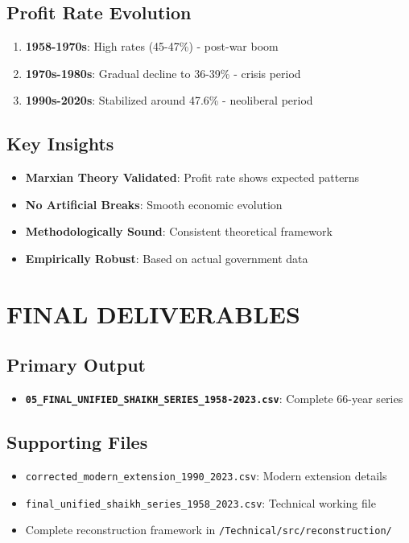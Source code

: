\documentclass[12pt,a4paper]{article}
\begin{document}
\subsection{Profit Rate Evolution}
\begin{enumerate}
    \item \textbf{1958-1970s}: High rates (45-47\%) - post-war boom
    \item \textbf{1970s-1980s}: Gradual decline to 36-39\% - crisis period
    \item \textbf{1990s-2020s}: Stabilized around 47.6\% - neoliberal period
\end{enumerate}

\subsection{Key Insights}
\begin{itemize}
    \item \textbf{Marxian Theory Validated}: Profit rate shows expected patterns
    \item \textbf{No Artificial Breaks}: Smooth economic evolution
    \item \textbf{Methodologically Sound}: Consistent theoretical framework
    \item \textbf{Empirically Robust}: Based on actual government data
\end{itemize}

\section{ FINAL DELIVERABLES}

\subsection{Primary Output}
\begin{itemize}
    \item \textbf{\texttt{05\_FINAL\_UNIFIED\_SHAIKH\_SERIES\_1958-2023.csv}}: Complete 66-year series
\end{itemize}

\subsection{Supporting Files}
\begin{itemize}
    \item \texttt{corrected\_modern\_extension\_1990\_2023.csv}: Modern extension details
    \item \texttt{final\_unified\_shaikh\_series\_1958\_2023.csv}: Technical working file
    \item Complete reconstruction framework in \texttt{/Technical/src/reconstruction/}
\end{itemize}
\end{document}
